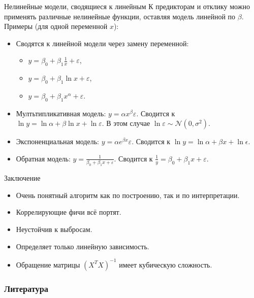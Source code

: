 \documentclass[9pt]{beamer}
\begin{document}
\begin{frame}{Нелинейные модели, сводящиеся к линейным}
К предикторам и отклику можно применять различные нелинейные функции, оставляя модель линейной по $\beta$. Примеры (для одной переменной $x$):
    \begin{itemize}
        \item Сводятся к линейной модели через замену переменной:
        \begin{itemize}
            \item $y = \beta_0 + \beta_1\frac{1}{x} + \varepsilon$,
            \item $y = \beta_0 + \beta_1\ln x + \varepsilon$,
            \item $y = \beta_0 + \beta_1 x^\alpha + \varepsilon$.
        \end{itemize}
        \item Мултьтипликативная модель: $y = \alpha x^\beta\varepsilon$. Сводится к $\ln y = \ln\alpha + \beta\ln x + \ln \varepsilon$. В этом случае $\ln \varepsilon \sim \mathcal{N}(0, \sigma^2)$.
        \item Экспоненциальная модель: $y = \alpha e^{\beta x}\varepsilon$. Сводится к $\ln y = \ln\alpha + \beta x + \ln \epsilon$.
        \item Обратная модель: $y = \frac{1}{\beta_0 + \beta_1 x + \varepsilon}$. Сводится к $\frac{1}{y} = \beta_0 + \beta_1 x + \varepsilon$.
    \end{itemize}
\end{frame}

\begin{frame}{Заключение}
\begin{itemize}
    \item Очень понятный алгоритм как по построению, так и по интерпретации.
    \item Коррелирующие фичи всё портят.
    \item Неустойчив к выбросам.
    \item Определяет только линейную зависимость.
    \item Обращение матрицы $(X^TX)^{-1}$ имеет кубическую сложность.
\end{itemize}
\end{frame}

\begin{frame}[allowframebreaks]
    \frametitle{Литература}
    
    \nocite{esl, linreg_habr}
    
\end{frame}
\end{document}
